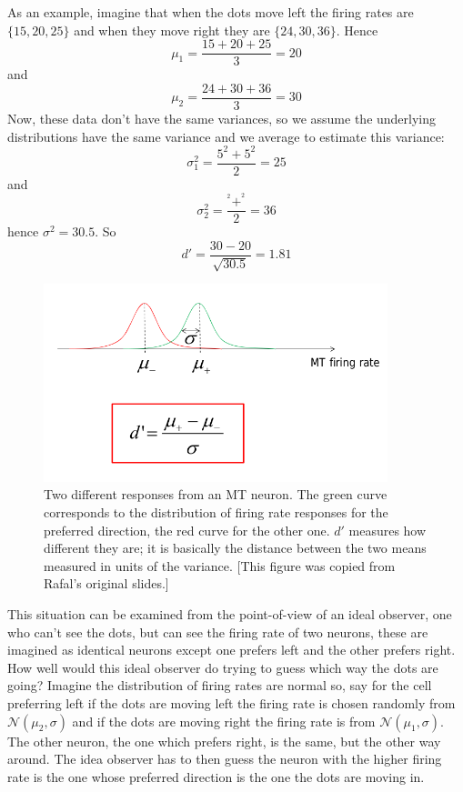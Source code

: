 \documentclass[11pt,a4paper]{scrartcl}
\begin{document}
As an example, imagine that when the dots move left the firing rates
are $\{15,20,25\}$ and when they move right they are
$\{24,30,36\}$. Hence
\begin{equation}
\mu_1=\frac{15+20+25}{3}=20
\end{equation}
and
\begin{equation}
\mu_2=\frac{24+30+36}{3}=30
\end{equation}
Now, these data don't have the same variances, so we assume the underlying distributions have the same variance and we average to estimate this variance:
\begin{equation}
\sigma_1^2=\frac{5^2+5^2}{2}=25
\end{equation}
and
\begin{equation}
\sigma_2^2=\frac{^^2+^^2}{2}=36
\end{equation}
hence $\sigma^2=30.5$. So
\begin{equation}
d'=\frac{30-20}{\sqrt{30.5}}=1.81
\end{equation}

\begin{figure}
\begin{center}
\includegraphics[width=10cm]{discrim.png}
\end{center}
\caption{Two different responses from an MT neuron. The green curve
  corresponds to the distribution of firing rate responses for the
  preferred direction, the red curve for the other one. $d'$ measures
  how different they are; it is basically the distance between the two
  means measured in units of the variance. [This figure was copied
  from Rafal's original slides.]\label{discrim}}
\end{figure}

This situation can be examined from the point-of-view of an ideal
observer, one who can't see the dots, but can see the firing rate of
two neurons, these are imagined as identical neurons except one
prefers left and the other prefers right. How well would this ideal
observer do trying to guess which way the dots are going? Imagine the
distribution of firing rates are normal so, say for the cell
preferring left if the dots are moving left the firing rate is chosen
randomly from $\mathcal{N}(\mu_2,\sigma)$ and if the dots are moving
right the firing rate is from $\mathcal{N}(\mu_1,\sigma)$. The other
neuron, the one which prefers right, is the same, but the other way
around. The idea observer has to then guess the neuron with the higher
firing rate is the one whose preferred direction is the one the dots
are moving in.
\end{document}
